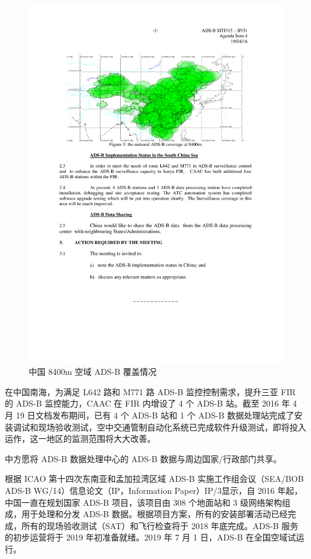 \begin{figure}[!htb]
\centering
\includegraphics[width=13cm]{pic/china_8400m.pdf}
\caption{中国 8400m 空域 ADS-B 覆盖情况\protect\footnotemark}
\label{fig:china_8400m}
\end{figure}


在中国南海，为满足 L642 路和 M771 路 ADS-B 监控控制需求，提升三亚 FIR 的 ADS-B 监控能力，CAAC 在 FIR 内增设了 4 个 ADS-B 站。截至 2016 年 4 月 19 日文档发布期间，已有 4 个 ADS-B 站和 1 个 ADS-B 数据处理站完成了安装调试和现场验收测试，空中交通管制自动化系统已完成软件升级测试，即将投入运作，这一地区的监测范围将大大改善。

中方愿将 ADS-B 数据处理中心的 ADS-B 数据与周边国家/行政部门共享。

根据 ICAO 第十四次东南亚和孟加拉湾区域 ADS-B 实施工作组会议（SEA/BOB ADS-B WG/14）信息论文（IP，Information Paper）IP/3显示，自 2016 年起，中国一直在规划国家 ADS-B 项目，该项目由 308 个地面站和 3 级网络架构组成，用于处理和分发 ADS-B 数据。根据项目方案，所有的安装部署活动已经完成，所有的现场验收测试（SAT）和飞行检查将于 2018 年底完成。ADS-B 服务的初步运营将于 2019 年初准备就绪。2019 年 7 月 1 日，ADS-B 在全国空域试运行。

